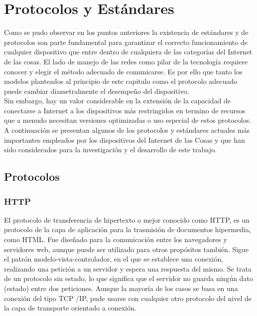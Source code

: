 \section{Protocolos y Estándares}
Como se pudo observar en los puntos anteriores la existencia de estándares y de protocolos son parte fundamental para garantizar el correcto funcionamiento de cualquier dispositivo que entre dentro de cualquiera de las categorías del Internet de las cosas. El lado de manejo de las redes como pilar de la tecnología requiere conocer y elegir el método adecuado de comunicarse. Es por ello que tanto los modelos planteados al principio de este capitulo\cite{rfc7452} como el protocolo adecuado puede cambiar diametralmente el desempeño del dispositivo.\\

Sin embargo, hay un valor considerable en la extensión de la capacidad de conectarse a Internet a los dispositivos más restringidos en termino de recursos que a menudo necesitan versiones optimizadas o uso especial de estos protocolos. A continuación se presentan algunos de los protocolos y estándares actuales más importantes empleados por los dispositivos del Internet de las Cosas y que han sido considerados para la investigación y el desarrollo de este trabajo.

\subsection{Protocolos}
\subsubsection{HTTP}
El protocolo de transferencia de hipertexto o mejor conocido como HTTP\cite{rfc1945}, es un protocolo de la capa de aplicación para la trasmisión de documentos hipermedia, como HTML. Fue diseñado para la comunicación entre los navegadores y servidores web, aunque puede ser utilizado para otros propósitos también. Sigue el patrón modelo-vista-controlador, en el que se establece una conexión, realizando una petición a un servidor y espera una respuesta del mismo. Se trata de un protocolo sin estado, lo que significa que el servidor no guarda ningún dato (estado) entre dos peticiones. Aunque la mayoría de los casos se basa en una conexión del tipo TCP /IP, pude usarse con cualquier otro protocolo del nivel de la capa de transporte orientado a conexión.\cite{mozillahttp}\\

